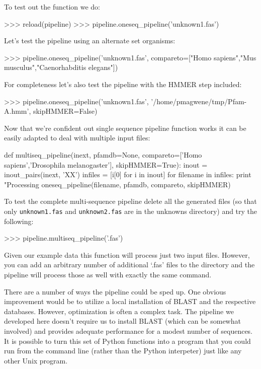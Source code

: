 \documentclass[10pt,letterpaper]{scrartcl}
\begin{document}
To test out the function we do:
\begin{python}
>>> reload(pipeline)
>>> pipeline.oneseq_pipeline('unknown1.fas')
\end{python}

Let's test the pipeline using an alternate set organisms:
\begin{python}
>>> pipeline.oneseq_pipeline('unknown1.fas', 
compareto=["Homo sapiens","Mus musculus","Caenorhabditis elegans"])
\end{python}

For completeness let's also test the pipeline with the HMMER step included:
\begin{python}
>>> pipeline.oneseq_pipeline('unknown1.fas', '/home/pmagwene/tmp/Pfam-A.hmm',
skipHMMER=False)
\end{python}

Now that we're confident out single sequence pipeline function works it can be easily adapted to deal with multiple input files:

\begin{python}
def multiseq_pipeline(inext, pfamdb=None, 
                compareto=['Homo sapiens','Drosophila melanogaster'],
                skipHMMER=True):   
    inout = inout_pairs(inext, 'XX')
    infiles = [i[0] for i in inout]
    for filename in infiles:
        print "Processing %
        oneseq_pipeline(filename, pfamdb, compareto, skipHMMER)        
\end{python}

To test the complete multi-sequence pipeline delete all the generated files (so that only \verb=unknown1.fas= and \verb=unknown2.fas= are in the unknowns directory) and try the following:
\begin{python}
>>> pipeline.multiseq_pipeline('.fas')
\end{python}

Given our example data this function will process just two input files.  However, you can add an arbitrary number of additional `.fas' files to the directory and the pipeline will process those as well with exactly the same command.

There are a number of ways the pipeline could be sped up. One obvious improvement would be to utilize a local installation of BLAST and the respective databases. However, optimization is often a complex task. The pipeline we developed here doesn't require us to install BLAST (which can be somewhat involved) and provides adequate performance for a modest number of sequences. It is possible to turn this set of Python functions into a program that you could run from the command line (rather than the Python interpeter) just like any other Unix program. 
\end{document}
